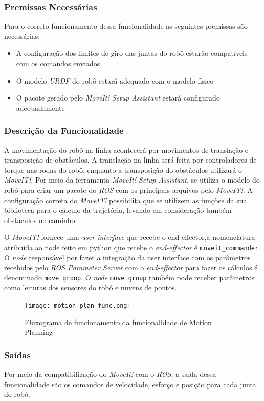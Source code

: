 \subsubsection{Premissas Necessárias}
Para o correto funcionamento dessa funcionalidade as seguintes premissas são necessárias:
\begin{itemize}
	\item A configuração dos limites de giro das juntas do robô estarão compatíveis com os comandos enviados
	\item O modelo \textit{URDF} do robô estará adequado com o modelo físico
	\item O pacote gerado pelo \textit{MoveIt! Setup Assistant} estará configurado adequadamente
\end{itemize}
\subsubsection{Descrição da Funcionalidade}
A movimentação do robô na linha acontecerá por movimentos de translação e transposição de obstáculos. A translação na linha será feita por controladores de torque nas rodas do robô, enquanto a transposição do obstáculos utilizará o \textit{MoveIT!}.
Por meio da ferramenta \textit{MoveIt! Setup Assistant}, se utiliza o modelo do robô para criar um pacote do \textit{ROS} com os principais arquivos pelo \textit{MoveIT!}. 
A configuração correta do \textit{MoveIT!} possibilita que se utilizem as funções da sua biblioteca para o cálculo da trajetória, levando em consideração também obstáculos no caminho.

O \textit{MoveIT!} fornece uma \textit{user interface} que recebe o end-effector,a nomenclatura atribuída ao node feito em python que recebe o \textit{end-effector} é \verb|moveit_commander|. O  \textit{node} responsável por fazer a integração da user interface com os parâmetros recebidos pelo \textit{ROS Parameter Server} com o \textit{end-effector} para fazer os cálculos é denominado \verb|move_group|. O \textit{node} \verb|move_group| também pode receber parâmetros como leituras dos sensores do robô e nuvens de pontos.

\begin{figure}[!h]
	\centering
	\texttt{[image: motion\_plan\_func.png]}
	\caption{Fluxograma de funcionamento da funcionalidade de Motion Planning}
	\label{fig:flux_motion}
\end{figure}

\subsubsection{Saídas}
Por meio da compatibilização do \textit{MoveIt!} com o \textit{ROS}, a saída dessa funcionalidade são os comandos de velocidade, esforço e posição para cada junta do robô.

